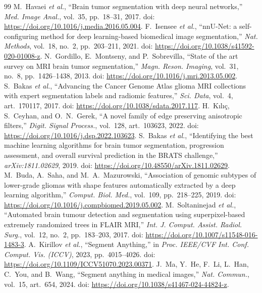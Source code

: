 \documentclass[11pt,a4paper]{article}
\begin{document}
\clearpage

\fi

\begin{thebibliography}{99}
 M.~Havaei \emph{et al.}, ``Brain tumor segmentation with deep neural networks,'' \emph{Med. Image Anal.}, vol.~35, pp.~18--31, 2017. doi: \url{https://doi.org/10.1016/j.media.2016.05.004}.
 F.~Isensee \emph{et al.}, ``nnU-Net: a self-configuring method for deep learning-based biomedical image segmentation,'' \emph{Nat. Methods}, vol.~18, no.~2, pp.~203--211, 2021. doi: \url{https://doi.org/10.1038/s41592-020-01008-z}.
 N.~Gordillo, E.~Montseny, and P.~Sobrevilla, ``State of the art survey on MRI brain tumor segmentation,'' \emph{Magn. Reson. Imaging}, vol.~31, no.~8, pp.~1426--1438, 2013. doi: \url{https://doi.org/10.1016/j.mri.2013.05.002}.
 S.~Bakas \emph{et al.}, ``Advancing the Cancer Genome Atlas glioma MRI collections with expert segmentation labels and radiomic features,'' \emph{Sci. Data}, vol.~4, art.~170117, 2017. doi: \url{https://doi.org/10.1038/sdata.2017.117}.
 H.~Kılıç, S.~Ceyhan, and O.~N.~Gerek, ``A novel family of edge preserving anisotropic filters,'' \emph{Digit. Signal Process.}, vol.~128, art.~103623, 2022. doi: \url{https://doi.org/10.1016/j.dsp.2022.103623}.
 S.~Bakas \emph{et al.}, ``Identifying the best machine learning algorithms for brain tumor segmentation, progression assessment, and overall survival prediction in the BRATS challenge,'' \emph{arXiv:1811.02629}, 2019. doi: \url{https://doi.org/10.48550/arXiv.1811.02629}.
 M.~Buda, A.~Saha, and M.~A.~Mazurowski, ``Association of genomic subtypes of lower-grade gliomas with shape features automatically extracted by a deep learning algorithm,'' \emph{Comput. Biol. Med.}, vol.~109, pp.~218--225, 2019. doi: \url{https://doi.org/10.1016/j.compbiomed.2019.05.002}.
 M.~Soltaninejad \emph{et al.}, ``Automated brain tumour detection and segmentation using superpixel-based extremely randomized trees in FLAIR MRI,'' \emph{Int. J. Comput. Assist. Radiol. Surg.}, vol.~12, no.~2, pp.~183--203, 2017. doi: \url{https://doi.org/10.1007/s11548-016-1483-3}.
 A.~Kirillov \emph{et al.}, ``Segment Anything,'' in \emph{Proc. IEEE/CVF Int. Conf. Comput. Vis. (ICCV)}, 2023, pp.~4015--4026. doi: \url{https://doi.org/10.1109/ICCV51070.2023.00371}.
 J.~Ma, Y.~He, F.~Li, L.~Han, C.~You, and B.~Wang, ``Segment anything in medical images,'' \emph{Nat. Commun.}, vol.~15, art.~654, 2024. doi: \url{https://doi.org/10.1038/s41467-024-44824-z}.

\end{thebibliography}
\end{document}
